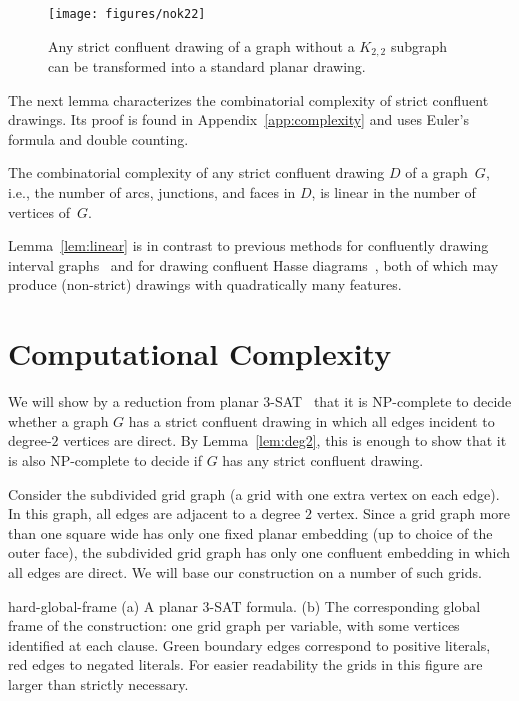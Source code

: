\documentclass{llncs}
\begin{document}
\begin{figure}[htbp]
	\centering
		\texttt{[image: figures/nok22]}
	\caption{Any strict confluent drawing of a graph without a $K_{2,2}$ subgraph can be transformed into a standard planar drawing.}
	\label{fig:no-k22}
\end{figure}

The next lemma characterizes the combinatorial complexity of strict confluent drawings. Its proof is found in Appendix~\ref{app:complexity} and uses Euler's formula and double counting.

\begin{lemma}\label{lem:linear}
	The combinatorial complexity of any strict confluent drawing $D$ of a graph~$G$, i.e., the number of arcs, junctions, and faces in $D$, is linear in the number of vertices of~$G$. 
\end{lemma}

Lemma~\ref{lem:linear} is in contrast to previous methods for confluently drawing interval graphs~\cite{degm-cd-05} and for drawing confluent Hasse diagrams~\cite{EppSim-GD-11}, both of which may produce (non-strict) drawings with quadratically many features.




\section {Computational Complexity}

We will show by a reduction from planar 3-SAT~\cite{l-pftu-82} that it is NP-complete to decide whether a graph $G$ has a strict confluent drawing in which all edges incident to degree-$2$ vertices are direct. By Lemma~\ref {lem:deg2}, this is enough to show that it is also NP-complete to decide if $G$ has any strict confluent drawing.



Consider the subdivided grid graph (a grid with one extra vertex on each edge). In this graph, all edges are adjacent to a degree $2$ vertex. Since a grid graph more than one square wide has only one fixed planar embedding (up to choice of the outer face), the subdivided grid graph has only one confluent embedding in which all edges are direct. We will base our construction on a number of such grids.

 {hard-global-frame}
{ (a) A planar 3-SAT formula.
  (b) The corresponding global frame of the construction: one grid graph per variable, with some vertices identified at each clause. Green boundary edges correspond to positive literals, red edges to negated literals.
      For easier readability the grids in this figure are larger than strictly necessary.
}
\end{document}
